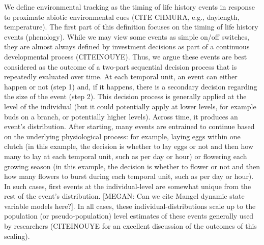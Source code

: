 \documentclass[11pt,letterpaper]{article}
\begin{document}
We define environmental tracking as the timing of life history events in response to proximate abiotic environmental cues (CITE CHMURA, e.g., daylength, temperature). The first part of this definition focuses on the timing of life history events (phenology). While we may view some events as simple on/off switches, they are almost always defined by investment decisions as part of a continuous developmental process (CITEINOUYE). Thus, we argue these events are best considered as the outcome of a two-part sequential decision process that is repeatedly evaluated over time. At each temporal unit, an event can either happen or not (step 1) and, if it happens, there is a secondary decision regarding the size of the event (step 2). This decision process is generally applied at the level of the individual (but it could potentially apply at lower levels, for example buds on a branch, or potentially higher levels). Across time, it produces an event's distribution. After starting, many events are entrained to continue based on the underlying physiological process: for example, laying eggs within one clutch (in this example, the decision is whether to lay eggs or not and then how many to lay at each temporal unit, such as per day or hour) or flowering each growing season (in this example, the decision is whether to flower or not and then how many flowers to burst during each temporal unit, such as per day or hour). In such cases, first events at the individual-level are somewhat unique from the rest of the event's distribution. [MEGAN: Can we cite Mangel dynamic state variable models here?]. In all cases, these individual-distributions scale up to the population (or pseudo-population) level estimates of these events generally used by researchers (CITEINOUYE for an excellent discussion of the outcomes of this scaling).
\end{document}

